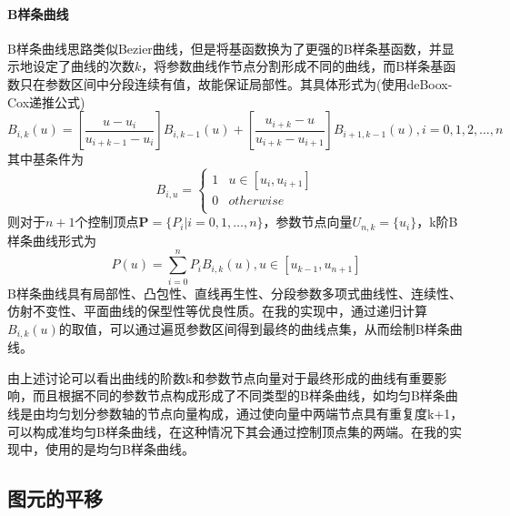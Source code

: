 \documentclass[a4paper,UTF8]{article}
\theoremstyle{definition}
\begin{document}
\paragraph{B样条曲线}
B样条曲线思路类似Bezier曲线，但是将基函数换为了更强的B样条基函数，并显示地设定了曲线的次数$k$，将参数曲线作节点分割形成不同的曲线，而B样条基函数只在参数区间中分段连续有值，故能保证局部性。其具体形式为(使用deBoox-Cox递推公式)
\begin{equation}
B_{i,k}(u)=[\frac{u-u_i}{u_{i+k-1}-u_i}]B_{i,k-1}(u)+
[\frac{u_{i+k}-u}{u_{i+k}-u_{i+1}}]B_{i+1,k-1}(u), i=0,1,2,\ldots,n
\end{equation}
其中基条件为
\begin{equation}
B_{i,u}=\left\{
\begin{array}{ll}
1 & u\in[u_{i},u_{i+1}] \\
0 & otherwise \\
\end{array}
\right.
\end{equation}
则对于$n+1$个控制顶点$\mathbf{P}=\{P_i|i=0,1,\ldots,n\}$，参数节点向量$U_{n,k}=\{u_i\}$，k阶B样条曲线形式为
\begin{equation}
P(u)=\sum_{i=0}^{n}P_iB_{i,k}(u), u\in[u_{k-1},u_{n+1}]
\end{equation}
B样条曲线具有局部性、凸包性、直线再生性、分段参数多项式曲线性、连续性、仿射不变性、平面曲线的保型性等优良性质。在我的实现中，通过递归计算$B_{i,k}(u)$的取值，可以通过遍觅参数区间得到最终的曲线点集，从而绘制B样条曲线。
\par 由上述讨论可以看出曲线的阶数k和参数节点向量对于最终形成的曲线有重要影响，而且根据不同的参数节点构成形成了不同类型的B样条曲线，如均匀B样条曲线是由均匀划分参数轴的节点向量构成，通过使向量中两端节点具有重复度k+1，可以构成准均匀B样条曲线，在这种情况下其会通过控制顶点集的两端。在我的实现中，使用的是均匀B样条曲线。
\subsection{图元的平移}
\end{document}

